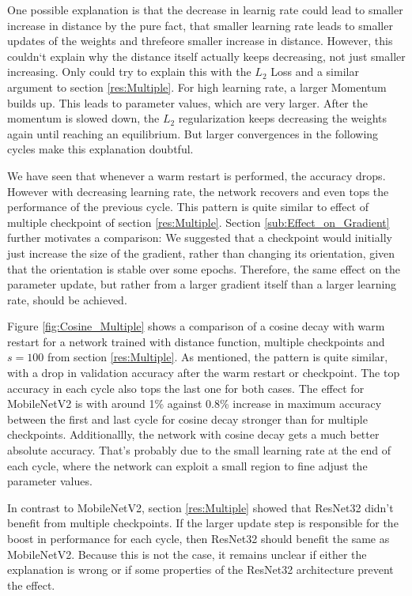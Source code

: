 One possible explanation is that the decrease in learnig rate could lead to
smaller increase in distance by the pure fact, that smaller learning rate leads
to smaller updates of the weights and threfeore smaller increase in distance.
However, this couldn`t explain why the distance itself actually keeps
decreasing, not just smaller increasing. Only could try to explain this with the
$L_2$ Loss and a similar argument to section \ref{res:Multiple}. For high
learning rate, a larger Momentum builds up. This leads to parameter values,
which are very larger. After the momentum is slowed down, the $L_2$
regularization keeps decreasing the weights again until reaching an equilibrium.
But larger convergences in the following cycles make this explanation doubtful. 


We have seen that whenever a warm restart is performed, the accuracy drops.
However with decreasing learning rate, the network recovers and even tops the
performance of the previous cycle. This pattern is quite similar to effect of
multiple checkpoint of section \ref{res:Multiple}. Section
\ref{sub:Effect_on_Gradient} further motivates a comparison: We suggested that a
checkpoint would initially just increase the size of the gradient, rather than
changing its orientation, given that the orientation is stable over some epochs.
Therefore, the same effect on the parameter update, but rather from a larger
gradient itself than a larger learning rate, should be achieved.

Figure \ref{fig:Cosine_Multiple} shows a comparison of a cosine decay with warm
restart for a network trained with distance function, multiple checkpoints and
$s=100$ from section \ref{res:Multiple}. As mentioned, the pattern is quite
similar, with a drop in validation accuracy after the warm restart or
checkpoint. The top accuracy in each cycle also tops the last one for both
cases. The effect for MobileNetV2 is with around 1\% against 0.8\% increase in
maximum accuracy between the first and last cycle for cosine decay stronger than
for multiple checkpoints. Additionallly, the network with cosine decay gets a
much better absolute accuracy. That's probably due to the small learning rate at
the end of each cycle, where the network can exploit a small region to fine
adjust the parameter values.

In contrast to MobileNetV2, section \ref{res:Multiple} showed that ResNet32
didn't benefit from multiple checkpoints. If the larger update step is responsible
for the boost in performance for each cycle, then ResNet32 should benefit the
same as MobileNetV2. Because this is not the case, it remains unclear if either
the explanation is wrong or if some properties of the ResNet32 architecture
prevent the effect.

